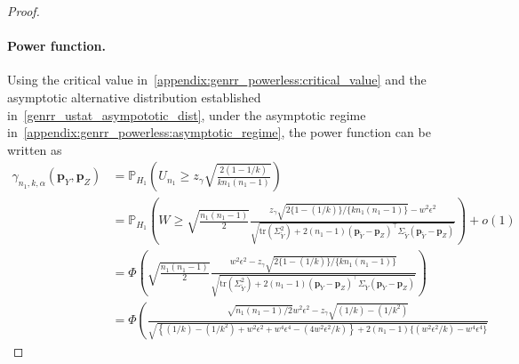 \documentclass[twoside,11pt]{article}
\newcommand{\rvTwo}{Y}
\newcommand{\rvThree}{Z}
\newcommand{\alphabetSize}{k} %
\newcommand{\sampleSize}{n}
\newcommand{\probVec}{\mathbf{p}} %
\newcommand{\privacyParameter}{\alpha} %
\begin{document}
\begin{appendix}
\begin{proof}
		\paragraph{Power function.}
		Using the critical value in~\eqref{appendix:genrr_powerless:critical_value}
		and the asymptotic alternative distribution established in~\eqref{genrr_ustat_asympototic_dist}, 
		under the asymptotic regime in~\eqref{appendix:genrr_powerless:asymptotic_regime},
		the power function can be written as
		\begin{align*}
			\gamma_{\sampleSize_1, \alphabetSize, \privacyParameter}
			(\probVec_\rvTwo,
			\probVec_\rvThree)
			&=
			\mathbb{P}_{H_1} \!
			\left(
			U_{n_1}
			\geq
			z_{\gamma}
			\sqrt{
				\frac{
					2(1 -  1/ \alphabetSize)}{
					\alphabetSize n_1(n_1-1)}
			}
			\right)
			\\&=
			\mathbb{P}_{H_1} \!
			\left(
			W
			\geq
			\sqrt{
				\frac{
					\sampleSize_1(\sampleSize_1-1)
				}{
					2
				} 
			}
			\frac{z_{\gamma}
				\sqrt{
					2\{1 - ( 1/ \alphabetSize) \}/ \{ \alphabetSize n_1(n_1-1)  \}
				}
				- w^2 \epsilon^2
			}{
				\sqrt{
					\mathrm{tr}(\Sigma_{\tilde{\rvTwo}}^2)
					+
					2(\sampleSize_1 - 1)
					(\probVec_{\tilde{\rvTwo}} - \probVec_\rvThree)^\top 
					\Sigma_{\tilde{\rvTwo}}
					(\probVec_{\tilde{\rvTwo}} - \probVec_\rvThree)	
				}
			}
			\right) + o(1)
			\\&=
			\Phi \!
			\left(
			\sqrt{
				\frac{
					\sampleSize_1(\sampleSize_1-1)
				}{
					2
				} 
			}
			\frac{
				w^2 \epsilon^2
				-
				z_{\gamma}
				\sqrt{
					2\{1 - ( 1/ \alphabetSize) \}/ \{ \alphabetSize n_1(n_1-1)  \}
				}
			}{
				\sqrt{
					\mathrm{tr}(\Sigma_{\tilde{\rvTwo}}^2)
					+
					2(\sampleSize_1 - 1)
					(\probVec_{\tilde{\rvTwo}} - \probVec_\rvThree)^\top 
					\Sigma_{\tilde{\rvTwo}}
					(\probVec_{\tilde{\rvTwo}} - \probVec_\rvThree)	
				}
			}
			\right)
			\\&=
			\Phi \!
			\left(
			\frac{
				\sqrt{
					\sampleSize_1(\sampleSize_1-1)
					/
					2
				}
				w^2 \epsilon^2
				-
				z_{\gamma}
				\sqrt{
					(1/\alphabetSize)
					-
					(1/\alphabetSize^2)
				}
			}{
				\sqrt{
					\left\{
					(1/\alphabetSize)
					-
					(1/\alphabetSize^2)
					+
					w^2 \epsilon^2
					+
					w^4 \epsilon^4
					-
					(4w^2 \epsilon^2/\alphabetSize)
					\right\}
					+
					2(\sampleSize_1 - 1)
					\bigl\{
					(w^2 \epsilon^2/\alphabetSize)
					-
					w^4 \epsilon^4
					\bigr\}	
				}
}
\end{align*}
\end{proof}
\end{appendix}
\end{document}
